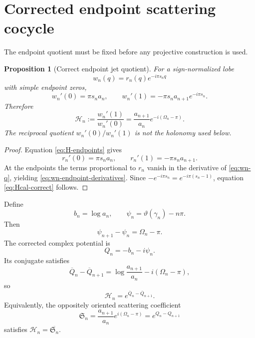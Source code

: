 \documentclass[11pt]{amsart}
\numberwithin{equation}{section}
\newtheorem{proposition}[theorem]{Proposition}
\theoremstyle{definition}
\theoremstyle{remark}
\newcommand{\Hcal}{\mathcal H}
\begin{document}
\section{Corrected endpoint scattering cocycle}
\label{sec:cocycle}

The endpoint quotient must be fixed before any projective construction is used.

\begin{proposition}[Correct endpoint jet quotient]
\label{prop:endpoint-jet-quotient}
For a sign-normalized lobe
\begin{equation}
w_n(q)=r_n(q)e^{-i\pi s_nq}
\label{eq:wn-q}
\end{equation}
with simple endpoint zeros,
\begin{equation}
w_n'(0)=\pi s_na_n,
\qquad
w_n'(1)=-\pi s_na_{n+1}e^{-i\pi s_n}.
\label{eq:wn-endpoint-derivatives}
\end{equation}
Therefore
\begin{equation}
\Hcal_n:=\frac{w_n'(1)}{w_n'(0)}
=
\frac{a_{n+1}}{a_n}e^{-i(\Omega_n-\pi)}.
\label{eq:Hcal-correct}
\end{equation}
The reciprocal quotient $w_n'(0)/w_n'(1)$ is not the holonomy used below.
\end{proposition}

\begin{proof}
Equation \eqref{eq:H-endpoints} gives
\begin{equation}
r_n'(0)=\pi s_na_n,
\qquad
r_n'(1)=-\pi s_na_{n+1}.
\label{eq:r-endpoint-derivatives}
\end{equation}
At the endpoints the terms proportional to $r_n$ vanish in the derivative of \eqref{eq:wn-q}, yielding \eqref{eq:wn-endpoint-derivatives}.  Since $-e^{-i\pi s_n}=e^{-i\pi(s_n-1)}$, equation \eqref{eq:Hcal-correct} follows.
\end{proof}

Define
\begin{equation}
b_n=\log a_n,
\qquad
\psi_n=\vartheta(\gamma_n)-n\pi.
\label{eq:b-psi}
\end{equation}
Then
\begin{equation}
\psi_{n+1}-\psi_n=\Omega_n-\pi.
\label{eq:psi-increment}
\end{equation}
The corrected complex potential is
\begin{equation}
Q_n=-b_n-i\psi_n.
\label{eq:Q-correct}
\end{equation}
Its conjugate satisfies
\begin{equation}
\overline Q_n-\overline Q_{n+1}
=\log\frac{a_{n+1}}{a_n}-i(\Omega_n-\pi),
\label{eq:Qbar-difference}
\end{equation}
so
\begin{equation}
\Hcal_n=e^{\overline Q_n-\overline Q_{n+1}}.
\label{eq:Hcal-cocycle}
\end{equation}
Equivalently, the oppositely oriented scattering coefficient
\begin{equation}
\mathfrak S_n
=\frac{a_{n+1}}{a_n}e^{i(\Omega_n-\pi)}
=e^{Q_n-Q_{n+1}}
\label{eq:Scattering-cocycle}
\end{equation}
satisfies $\Hcal_n=\overline{\mathfrak S_n}$.
\end{document}
